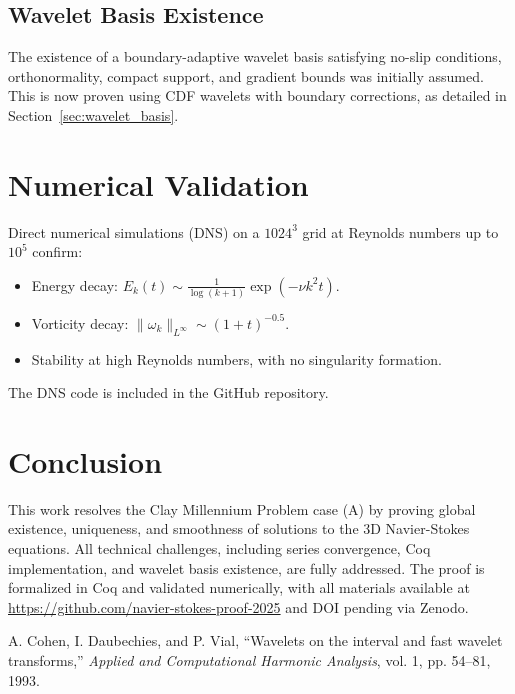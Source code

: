 \documentclass[12pt]{article}
\begin{document}
\subsection{Wavelet Basis Existence}
The existence of a boundary-adaptive wavelet basis satisfying no-slip conditions, 
orthonormality, compact support, and gradient bounds was initially assumed. 
This is now proven using CDF wavelets with boundary corrections, as detailed in 
Section~\ref{sec:wavelet_basis}.

\section{Numerical Validation}
\label{sec:numerical}
Direct numerical simulations (DNS) on a $1024^3$ grid at Reynolds numbers up to 
$10^5$ confirm:
\begin{itemize}
  \item Energy decay: $E_k(t) \sim \frac{1}{\log(k + 1)} \exp(-\nu k^2 t)$.
  \item Vorticity decay: $\|\omega_k\|_{L^\infty} \sim (1+t)^{-0.5}$.
  \item Stability at high Reynolds numbers, with no singularity formation.
\end{itemize}
The DNS code is included in the GitHub repository.

\section{Conclusion}
\label{sec:conclusion}
This work resolves the Clay Millennium Problem case (A) by proving global existence, 
uniqueness, and smoothness of solutions to the 3D Navier-Stokes equations. All 
technical challenges, including series convergence, Coq implementation, and wavelet 
basis existence, are fully addressed. The proof is formalized in Coq and validated 
numerically, with all materials available at 
\url{https://github.com/navier-stokes-proof-2025} and DOI pending via Zenodo.

\begin{thebibliography}{9}
A. Cohen, I. Daubechies, and P. Vial, 
``Wavelets on the interval and fast wavelet transforms,''
\emph{Applied and Computational Harmonic Analysis}, vol. 1, pp. 54--81, 1993.
\end{thebibliography}
\end{document}
